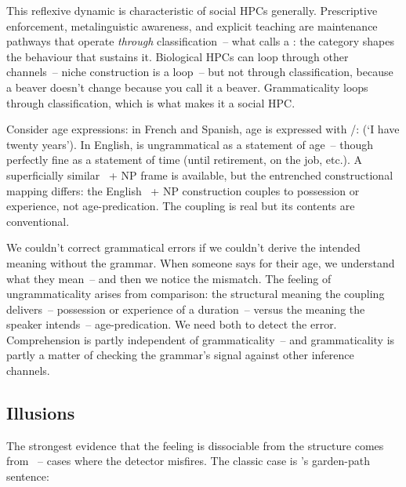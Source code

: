 This reflexive dynamic is characteristic of social HPCs generally. Prescriptive enforcement, metalinguistic awareness, and explicit teaching are maintenance pathways that operate \emph{through} classification~-- what \textcite{hacking1999} calls a : the category shapes the behaviour that sustains it. Biological HPCs can loop through other channels~-- niche construction is a loop~-- but not through classification, because a beaver doesn't change because you call it a beaver. Grammaticality loops through classification, which is what makes it a social HPC.

Consider age expressions: in French and Spanish, age is expressed with /:  (`I have twenty years'). In English, \ungram{} is ungrammatical as a statement of age~-- though perfectly fine as a statement of time (until retirement, on the job, etc.). A superficially similar ~+ NP frame is available, but the entrenched constructional mapping differs: the English ~+ NP construction couples to possession or experience, not age-predication. The coupling is real but its contents are conventional.

We couldn't correct grammatical errors if we couldn't derive the intended meaning without the grammar. When someone says \ungram{} for their age, we understand what they mean~-- and then we notice the mismatch. The feeling of ungrammaticality arises from comparison: the structural meaning the coupling delivers~-- possession or experience of a duration~-- versus the meaning the speaker intends~-- age-predication. We need both to detect the error. Comprehension is partly independent of grammaticality~-- and grammaticality is partly a matter of checking the grammar's signal against other inference channels.

\subsection{Illusions}
\label{sec:15:illusions}

The strongest evidence that the feeling is dissociable from the structure comes from ~-- cases where the detector misfires. The classic case is \textcite{Bever1970}'s garden-path sentence:

